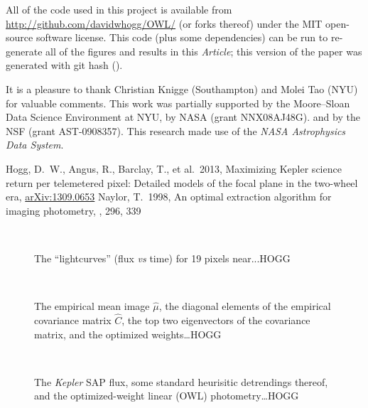 \documentclass[12pt, letterpaper, preprint]{aastex}
\newcommand{\documentname}{\textsl{Article}}
\newcommand{\project}[1]{\textsl{#1}}
\newcommand{\foreign}[1]{\textsl{#1}}
\newcommand{\etal}{\foreign{et\,al.}}
\begin{document}
All of the code used in this project is available
  from \url{http://github.com/davidwhogg/OWL/} (or forks thereof)
  under the MIT open-source software license.
This code (plus some dependencies) can be run
  to re-generate all of the figures and results in this \documentname;
  this version of the paper was generated with git hash
  \texttt{\githash} (\gitdate).

\acknowledgments
It is a pleasure to thank
  Christian Knigge (Southampton) and
  Molei Tao (NYU)
for valuable comments.
This work was partially supported by the Moore--Sloan Data Science Environment at NYU,
  by NASA (grant NNX08AJ48G).
  and by the NSF (grant AST-0908357).
This research made use of the \project{NASA Astrophysics Data System}.

\newcommand{\arxiv}[1]{\href{http://arxiv.org/abs/#1}{arXiv:#1}}
\begin{thebibliography}{}\raggedright
\bibitem[Hogg \etal(2013)]{hoggwhitepaper}
Hogg, D.~W., Angus, R., Barclay, T., et al.\ 2013,
Maximizing Kepler science return per telemetered pixel: Detailed models of the focal plane in the two-wheel era,
\arxiv{1309.0653}
Naylor, T.\ 1998,
An optimal extraction algorithm for imaging photometry,
\mnras, 296, 339
\end{thebibliography}

\clearpage

\begin{figure}
~
\caption{
The ``lightcurves'' (flux \foreign{vs} time) for 19 pixels near...HOGG
\label{fig:pixels}}
\end{figure}

\begin{figure}
~
\caption{
The empirical mean image $\hat{\mu}$,
  the diagonal elements of the empirical covariance matrix $\hat{C}$,
  the top two eigenvectors of the covariance matrix,
  and the optimized weights\ldots HOGG
\label{fig:images}}
\end{figure}

\begin{figure}
~
\caption{
The \project{Kepler} SAP flux,
  some standard heurisitic detrendings thereof,
  and the optimized-weight linear (OWL) photometry\ldots HOGG
\label{fig:results}}
\end{figure}
\end{document}
